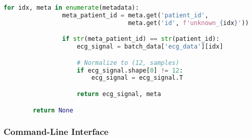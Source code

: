 \documentclass[11pt]{article}
\begin{document}
\begin{lstlisting}[language=Python, caption=NPZ Loader with Error Handling]
            for idx, meta in enumerate(metadata):
                meta_patient_id = meta.get('patient_id',
                                  meta.get('id', f'unknown_{idx}'))

                if str(meta_patient_id) == str(patient_id):
                    ecg_signal = batch_data['ecg_data'][idx]

                    # Normalize to (12, samples)
                    if ecg_signal.shape[0] != 12:
                        ecg_signal = ecg_signal.T

                    return ecg_signal, meta

        return None
\end{lstlisting}

\subsubsection{Command-Line Interface}
\end{document}
